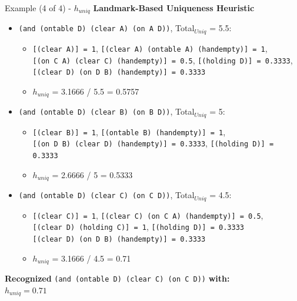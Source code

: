 \documentclass{beamer}
\def\masterclass{1}
\begin{document}
    \begin{frame}{Example (4 of 4) - $h_{uniq}$}
		\textbf{Landmark-Based Uniqueness Heuristic}
       	\begin{itemize}
       		\item \texttt{(and (ontable D) (clear A) (on A D))}, Total$_{Uniq}$ = 5.5:
				\begin{itemize}
					\item {\scriptsize \texttt{[(clear A)] = 1}, \texttt{[(clear A) (ontable A) (handempty)] = 1},
					\\ \texttt{[(on C A) (clear C) (handempty)] = 0.5}, \texttt{[(holding D)] = 0.3333},
					\\ \texttt{[(clear D) (on D B) (handempty)] = 0.3333}}
					\item $h_{uniq}$ = 3.1666 / 5.5 = 0.5757
				\end{itemize}
			\item \texttt{(and (ontable D) (clear B) (on B D))}, Total$_{Uniq}$ = 5:
				\begin{itemize}
					\item {\scriptsize \texttt{[(clear B)] = 1}, \texttt{[(ontable B) (handempty)] = 1},
					\\ \texttt{[(on D B) (clear D) (handempty)] = 0.3333}, \texttt{[(holding D)] = 0.3333}}
					\item $h_{uniq}$ = 2.6666 / 5 = 0.5333
				\end{itemize}
			\item \texttt{(and (ontable D) (clear C) (on C D))}, Total$_{Uniq}$ = 4.5:
				\begin{itemize}
					\item {\scriptsize \texttt{[(clear C)] = 1}, \texttt{[(clear C) (on C A) (handempty)] = 0.5},
					\\ \texttt{[(clear D) (holding C)] = 1}, \texttt{[(holding D)] = 0.3333}
					\\ \texttt{[(clear D) (on D B) (handempty)] = 0.3333}}
					\item $h_{uniq}$ = 3.1666 / 4.5 = 0.71
				\end{itemize}
		\end{itemize}

		\textbf{Recognized} {\footnotesize \texttt{(and (ontable D) (clear C) (on C D))}} \textbf{with: }
		\\ $h_{uniq} = 0.71$
    \end{frame}

\end{document}
